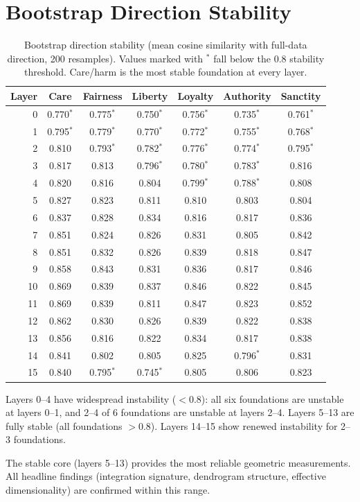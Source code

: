 \section{Bootstrap Direction Stability}\label{bootstrap-direction-stability}

\label{app:bootstrap}

\begin{table}[h]
\centering
\caption{Bootstrap direction stability (mean cosine similarity with full-data direction, 200 resamples). Values marked with $^*$ fall below the 0.8 stability threshold. Care/harm is the most stable foundation at every layer.}
\label{tab:bootstrap}
\small
\begin{tabular}{r cccccc}
\toprule
Layer & Care & Fairness & Liberty & Loyalty & Authority & Sanctity \\
\midrule
0  & 0.770$^*$ & 0.775$^*$ & 0.750$^*$ & 0.756$^*$ & 0.735$^*$ & 0.761$^*$ \\
1  & 0.795$^*$ & 0.779$^*$ & 0.770$^*$ & 0.772$^*$ & 0.755$^*$ & 0.768$^*$ \\
2  & 0.810 & 0.793$^*$ & 0.782$^*$ & 0.776$^*$ & 0.774$^*$ & 0.795$^*$ \\
3  & 0.817 & 0.813 & 0.796$^*$ & 0.780$^*$ & 0.783$^*$ & 0.816 \\
4  & 0.820 & 0.816 & 0.804 & 0.799$^*$ & 0.788$^*$ & 0.808 \\
5  & 0.827 & 0.823 & 0.811 & 0.810 & 0.803 & 0.804 \\
6  & 0.837 & 0.828 & 0.834 & 0.816 & 0.817 & 0.836 \\
7  & 0.851 & 0.824 & 0.826 & 0.831 & 0.805 & 0.842 \\
8  & 0.851 & 0.832 & 0.826 & 0.839 & 0.818 & 0.847 \\
9  & 0.858 & 0.843 & 0.831 & 0.836 & 0.817 & 0.846 \\
10 & 0.869 & 0.839 & 0.837 & 0.846 & 0.822 & 0.845 \\
11 & 0.869 & 0.839 & 0.811 & 0.847 & 0.823 & 0.852 \\
12 & 0.862 & 0.830 & 0.826 & 0.839 & 0.822 & 0.838 \\
13 & 0.856 & 0.816 & 0.822 & 0.834 & 0.817 & 0.838 \\
14 & 0.841 & 0.802 & 0.805 & 0.825 & 0.796$^*$ & 0.831 \\
15 & 0.840 & 0.795$^*$ & 0.745$^*$ & 0.805 & 0.806 & 0.823 \\
\bottomrule
\end{tabular}
\end{table}

Layers 0--4 have widespread instability (\(< 0.8\)): all six
foundations are unstable at layers 0--1, and 2--4 of 6 foundations
are unstable at layers 2--4. Layers 5--13 are fully stable (all
foundations \(> 0.8\)). Layers 14--15 show renewed instability for
2--3 foundations.

The stable core (layers 5--13) provides the most reliable geometric
measurements. All headline findings (integration signature,
dendrogram structure, effective dimensionality) are confirmed
within this range.
